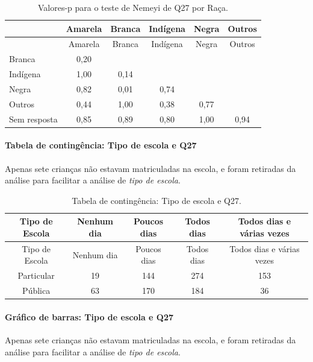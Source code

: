 \documentclass[]{article}
\let\oldparagraph\paragraph
\renewcommand{\paragraph}[1]{\oldparagraph{#1}\mbox{}}
\begin{document}
\begin{longtable}[]{@{}lccccc@{}}
\caption{\label{tab:unnamed-chunk-819}Valores-p para o teste de Nemeyi de Q27 por Raça.}\tabularnewline
\toprule
& Amarela & Branca & Indígena & Negra & Outros\tabularnewline
\midrule
\endfirsthead
\toprule
& Amarela & Branca & Indígena & Negra & Outros\tabularnewline
\midrule
\endhead
Branca & 0,20 & & & &\tabularnewline
Indígena & 1,00 & 0,14 & & &\tabularnewline
Negra & 0,82 & 0,01 & 0,74 & &\tabularnewline
Outros & 0,44 & 1,00 & 0,38 & 0,77 &\tabularnewline
Sem resposta & 0,85 & 0,89 & 0,80 & 1,00 & 0,94\tabularnewline
\bottomrule
\end{longtable}

\cleardoublepage

\hypertarget{tabela-de-continguxeancia-tipo-de-escola-e-q27}{%
\paragraph{Tabela de contingência: Tipo de escola e Q27}\label{tabela-de-continguxeancia-tipo-de-escola-e-q27}}

Apenas sete crianças não estavam matriculadas na escola, e foram retiradas da análise para facilitar a análise de \emph{tipo de escola}.

\begin{longtable}[]{@{}ccccc@{}}
\caption{\label{tab:unnamed-chunk-820}Tabela de contingência: Tipo de escola e Q27.}\tabularnewline
\toprule
Tipo de Escola & Nenhum dia & Poucos dias & Todos dias & Todos dias e várias vezes\tabularnewline
\midrule
\endfirsthead
\toprule
Tipo de Escola & Nenhum dia & Poucos dias & Todos dias & Todos dias e várias vezes\tabularnewline
\midrule
\endhead
Particular & 19 & 144 & 274 & 153\tabularnewline
Pública & 63 & 170 & 184 & 36\tabularnewline
\bottomrule
\end{longtable}

\hypertarget{gruxe1fico-de-barras-tipo-de-escola-e-q27}{%
\paragraph{Gráfico de barras: Tipo de escola e Q27}\label{gruxe1fico-de-barras-tipo-de-escola-e-q27}}

Apenas sete crianças não estavam matriculadas na escola, e foram retiradas da análise para facilitar a análise de \emph{tipo de escola}.
\end{document}

